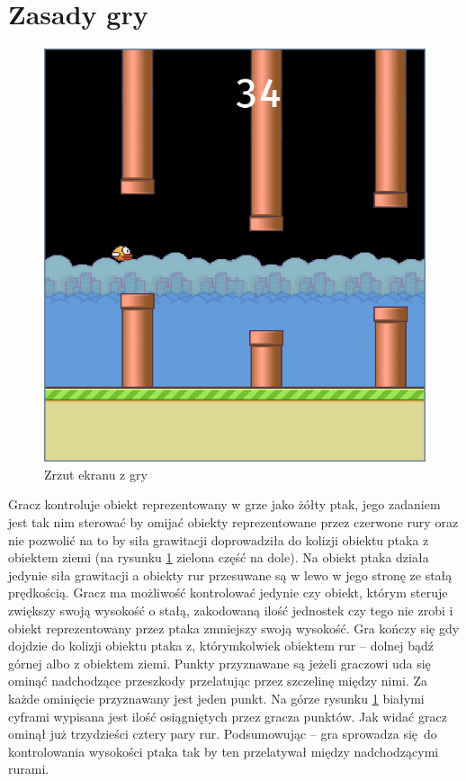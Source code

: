 \documentclass[a4paper,12pt,oneside]{book}
\begin{document}
\section{Zasady gry} 
\begin{figure}[h] 
	\begin{center}
		\includegraphics[scale=0.40]{flappy_bird.png}
		\caption{Zrzut ekranu z gry}
		\label{flappy_screenshot}
	\end{center}
\end{figure}

Gracz kontroluje obiekt reprezentowany w grze jako żółty ptak,
jego zadaniem jest tak nim sterować by omijać obiekty reprezentowane przez 
czerwone rury oraz nie pozwolić na to by siła grawitacji doprowadziła do
kolizji obiektu ptaka z obiektem ziemi (na rysunku \ref{flappy_screenshot}
zielona część na dole). Na obiekt ptaka działa jedynie siła grawitacji a
obiekty rur przesuwane są w lewo w jego stronę ze stałą prędkością. Gracz
ma możliwość kontrolować jedynie czy obiekt, którym steruje zwiększy swoją
wysokość o stałą, zakodowaną ilość jednostek czy tego nie zrobi i obiekt
reprezentowany przez ptaka zmniejszy swoją wysokość. Gra kończy się gdy
dojdzie do kolizji obiektu ptaka z, którymkolwiek obiektem rur -- dolnej
bądź górnej albo z obiektem ziemi. Punkty przyznawane są jeżeli graczowi uda
się ominąć nadchodzące przeszkody przelatując przez szczelinę między nimi.
Za każde ominięcie przyznawany jest jeden punkt. Na górze rysunku
\ref{flappy_screenshot} białymi cyframi wypisana jest ilość osiągniętych przez
gracza punktów. Jak widać gracz ominął już trzydzieści cztery pary rur.
Podsumowując -- gra sprowadza się do kontrolowania wysokości ptaka tak by ten
przelatywał między nadchodzącymi rurami.
\end{document}

